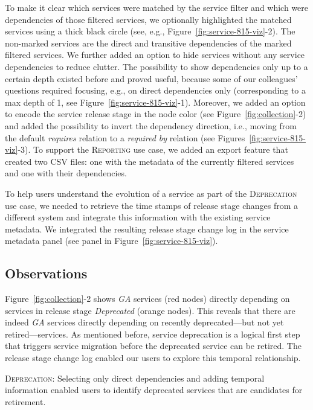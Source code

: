 \documentclass[conference]{IEEEtran}
\begin{document}
To make it clear which services were matched by the service filter and which were dependencies of those filtered services, we optionally highlighted the matched services using a thick black circle (see, e.g., Figure~\ref{fig:service-815-viz}-2).
The non-marked services are the direct and transitive dependencies of the marked filtered services. 
We further added an option to hide services without any service dependencies to reduce clutter.
The possibility to show dependencies only up to a certain depth existed before and proved useful, because some of our colleagues' questions required focusing, e.g., on direct dependencies only (corresponding to a max depth of 1, see Figure~\ref{fig:service-815-viz}-1).
Moreover, we added an option to encode the service release stage in the node color (see Figure~\ref{fig:collection}-2) and added the possibility to invert the dependency direction, i.e., moving from the default \emph{requires} relation to a \emph{required by} relation (see Figures~\ref{fig:service-815-viz}-3).
To support the \textsc{Reporting} use case, we added an export feature that created two CSV files: one with the metadata of the currently filtered services and one with their dependencies.

To help users understand the evolution of a service as part of the \textsc{Deprecation} use case, we needed to retrieve the time stamps of release stage changes from a different system and integrate this information with the existing service metadata.
We integrated the resulting release stage change log in the service metadata panel (see panel in Figure~\ref{fig:service-815-viz}).

\subsection{Observations}

Figure~\ref{fig:collection}-2 shows \emph{GA} services (red nodes) directly depending on services in release stage \emph{Deprecated} (orange nodes).
This reveals that there are indeed \emph{GA} services directly depending on recently deprecated---but not yet retired---services.
As mentioned before, service deprecation is a logical first step that triggers service migration before the deprecated service can be retired.
The release stage change log enabled our users to explore this temporal relationship.

\begin{roundedbox}
\noindent\textsc{Deprecation}: Selecting only direct dependencies and adding temporal information enabled users to identify deprecated services that are candidates for retirement.
\end{roundedbox}
\end{document}
